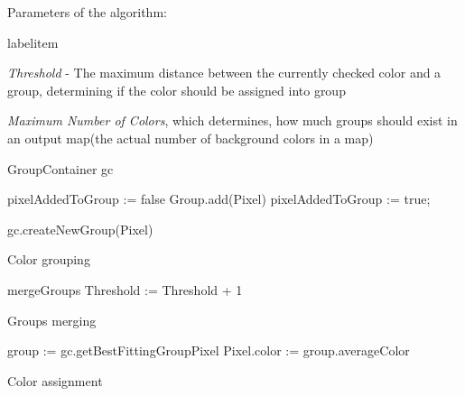 \documentclass[a4paper,onecolumn,oneside,12pt]{memoir}
\makeatletter
\renewenvironment{itemize}{
  \begin{list}{  
  \csname labelitem\romannumeral\the\@listdepth\endcsname}{
  \setlength{\leftmargin}{1em}
	\setlength{\topsep}{6pt}%
	\setlength{\partopsep}{0pt}%
	\setlength{\parskip}{0pt}%
	\setlength{\parsep}{0pt}%
	\setlength{\itemsep}{0pt}}
}{
  \end{list}
}
\makeatother
\begin{document}
Parameters of the algorithm:
\begin{itemize}
  \item \textit{Threshold} - The maximum distance between the currently checked color and a group,
          determining if the color should be assigned into group
  \item \textit{Maximum Number of Colors}, which determines, how much groups should exist in an
          output map(the actual number of background colors in a map)
\end{itemize}

\begin{algorithm}[!ht]

  GroupContainer gc\;
  {
    pixelAddedToGroup := false\;
    {
      {
        Group.add(Pixel)\;
        pixelAddedToGroup := true;
      }
    }

    {
      gc.createNewGroup(Pixel)\;
    }
  }


  \caption{Color grouping}
  \label{colorGroupingAlgorithm}
\end{algorithm}

\begin{algorithm}[!ht]

  {
    {
      {
        {
          mergeGroups\;
        }
      }
    }
    Threshold := Threshold + 1\;
  }


  \caption{Groups merging}
  \label{groupsMergingAlgorithm}
\end{algorithm}

\begin{algorithm}[!ht]

  {
    group := gc.getBestFittingGroup{Pixel}\;
    Pixel.color := group.averageColor\;
  }


  \caption{Color assignment}
  \label{colorAssignmentAlgorithm}
\end{algorithm}
\end{document}
